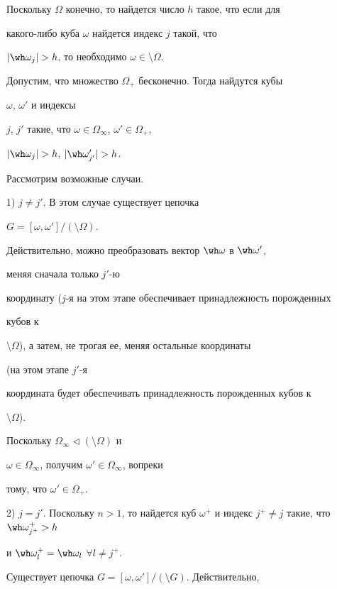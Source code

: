  


\begin{pf} 


Поскольку $\Omega$ конечно, то найдется число $h$ такое, что если для 


какого-либо куба $\omega$ найдется индекс $j$ такой, что 


$|\wh\omega_j|>h$, то необходимо $\omega\in\setminus\Omega$. 


Допустим, что множество $\Omega_+$ бесконечно. Тогда найдутся кубы 


$\omega$, $\omega'$ и индексы 


$j$, $j'$ такие, что $\omega\in\Omega_\infty$, $\omega'\in\Omega_+$, 


$|\wh\omega_j|>h$, $|\wh\omega'_{j'}|>h$. 


Рассмотрим возможные случаи. 


 


1) $j\ne j'$. В этом случае существует цепочка 


$G=[\omega,\omega']/(\setminus\Omega)$. 


Действительно, можно преобразовать вектор $\wh\omega$ в $\wh\omega'$, 


меняя сначала только $j'$-ю 


координату ($j$-я на этом этапе обеспечивает принадлежность порожденных 


кубов к 


$\setminus\Omega$), а затем, не трогая ее, меняя остальные координаты 


(на этом этапе $j'$-я 


координата будет обеспечивать принадлежность порожденных кубов к 


$\setminus\Omega$). 


Поскольку $\Omega_\infty\vartriangleleft(\setminus\Omega)$ и 


$\omega\in\Omega_\infty$, получим $\omega'\in\Omega_\infty$, вопреки 


тому, что $\omega'\in\Omega_+$. 


 


2) $j=j'$. Поскольку $n>1$, то найдется куб $\omega^+$ и индекс $j^+\ne 


j$ такие, что $\wh\omega^+_{j^+}>h$ 


и $\wh\omega^+_l=\wh\omega_l$ $\forall l\ne j^+$. 


Существует цепочка $G=[\omega,\omega']/(\setminus G)$. Действительно, 



\end{pf}
